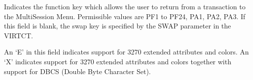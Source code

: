 \documentclass[letterpaper,10pt,english]{sphinxmanual}
\begin{document}
\begin{description}
\sphinxAtStartPar
Indicates the function key which allows the user to return from a transaction to the Multi\sphinxhyphen{}Session Menu. Permissible values are PF1 to PF24, PA1, PA2, PA3. If this field is blank, the swap key is specified by the SWAP parameter in the VIRTCT.

\sphinxAtStartPar
An ‘E’ in this field indicates support for 3270 extended attributes and colors. An ‘X’ indicates support for 3270 extended attributes and colors together with support for DBCS (Double Byte Character Set).

\end{description}

\ignorespaces 
\end{document}
